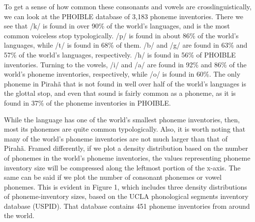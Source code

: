 \documentclass[output=paper,colorlinks,citecolor=brown
]{langscibook}
\begin{document}
    To get a sense of how common these consonants and vowels are crosslinguistically, we can look at the PHOIBLE database of 3,183 phoneme inventories.\cite{phoible} There we see that /k/ is found in over 90\% of the world’s languages, and is the most common voiceless stop typologically. /p/ is found in about 86\% of the world’s languages, while /t/ is found in 68\% of them. /b/ and /g/ are found in 63\% and 57\% of the world’s languages, respectively. /h/ is found in 56\% of PHOIBLE inventories. Turning to the vowels, /i/ and /a/ are found in 92\% and 86\% of the world’s phoneme inventories, respectively, while /o/ is found in 60\%. The only phoneme in Pirahã that is not found in well over half of the world’s languages is the glottal stop, and even that sound is fairly common as a phoneme, as it is found in 37\% of the phoneme inventories in PHOIBLE.

    While the language has one of the world’s smallest phoneme inventories, then, most its phonemes are quite common typologically. Also, it is worth noting that many of the world's phoneme inventories are not much larger than that of Pirahã. Framed differently, if we plot a density distribution based on the number of phonemes in the world’s phoneme inventories, the values representing phoneme inventory size will be compressed along the leftmost portion of the x-axis. The same can be said if we plot the number of consonant phonemes or vowel phonemes. This is evident in Figure 1, which includes three density distributions of phoneme-inventory sizes, based on the UCLA phonological segments inventory database (USPID).\cite{maddieson1989updating} That database contains 451 phoneme inventories from around the world.
\end{document}

